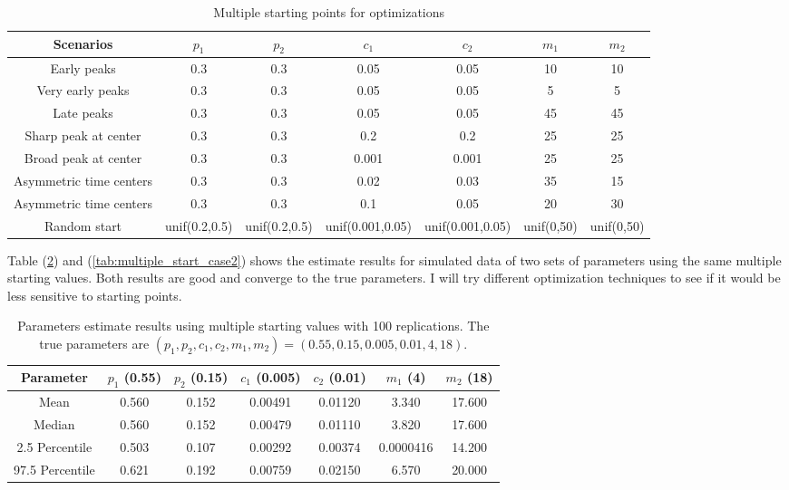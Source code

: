 \documentclass[11pt]{article}
\begin{document}
\begin{table}[!ht]
    \centering
    \begin{tabular}{|c|c|c|c|c|c|c|}
    \hline
         Scenarios & $p_1$ & $p_2$ &$c_1$ &$c_2$ & $m_1$ & $m_2$ \\
         \hline
         Early peaks&	0.3&	0.3&	0.05&	0.05&	10&	10\\
         Very early peaks&	0.3&	0.3&	0.05&	0.05&	5&	5\\
         Late peaks&	0.3&	0.3&	0.05&	0.05&	45&	45\\
         Sharp peak at center&	0.3&	0.3&	0.2&	0.2&	25&	25\\
         Broad peak at center&	0.3&	0.3&	0.001&	0.001&	25&	25\\
         Asymmetric time centers&	0.3&	0.3&	0.02&	0.03&	35&	15\\
         Asymmetric time centers&	0.3&	0.3&	0.1&	0.05&	20&	30\\
         Random start & unif(0.2,0.5) & unif(0.2,0.5) & unif(0.001,0.05) & unif(0.001,0.05) & unif(0,50) & unif(0,50)\\
         \hline
    \end{tabular}
    \caption{Multiple starting points for optimizations}
    \label{tab:starting_points}
\end{table}

Table (\ref{tab:multiple_start_case1}) and (\ref{tab:multiple_start_case2}) shows the estimate results for simulated data of two sets of parameters using the same multiple starting values. Both results are good and converge to the true parameters. I will try different optimization techniques to see if it would be less sensitive to starting points.

\begin{table}[!ht]
    \centering
    \begin{tabular}{|c|c|c|c|c|c|c|}
    \hline
         Parameter& $p_1$ (0.55)& $p_2$ (0.15) &$c_1$ (0.005) &$c_2$ (0.01) & $m_1$ (4)& $m_2$ (18) \\
         \hline
         Mean & 0.560 & 0.152& 0.00491 & 0.01120	& 3.340 & 17.600 \\
         Median	& 0.560 & 0.152 & 0.00479 & 0.01110 &3.820& 17.600 \\
         2.5 Percentile&	0.503&	0.107&	0.00292& 0.00374 &	0.0000416 & 14.200 \\
         97.5 Percentile &	0.621&	0.192&	0.00759&	0.02150&	6.570&	20.000\\
         \hline
    \end{tabular}
    \caption{Parameters estimate results using multiple starting values with 100 replications. The true parameters are $(p_1, p_2, c_1 ,c_2, m_1,m_2) = (0.55, 0.15, 0.005, 0.01, 4, 18)$.}
    \label{tab:multiple_start_case1}
\end{table}
\end{document}
